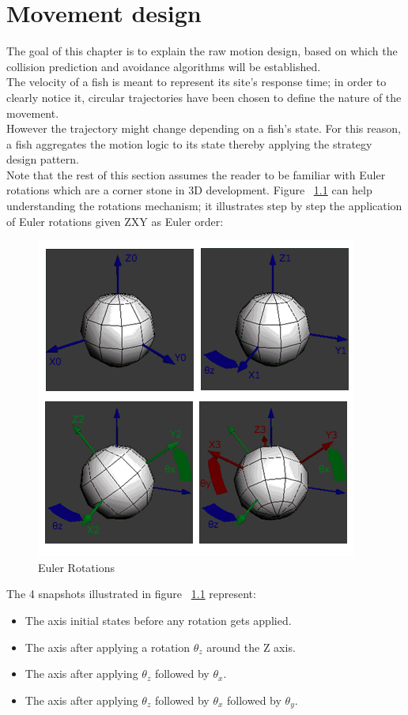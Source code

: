\chapter{Movement design}
The goal of this chapter is to explain the raw motion design, based on which the collision prediction and avoidance algorithms will be established.\\

The velocity of a fish is meant to represent its site's response time; in order to clearly notice it, circular trajectories have been chosen to define the nature of the movement.\\

However the trajectory might change depending on a fish's state. For this reason, a fish aggregates the motion logic to its state thereby applying the strategy design pattern.\\

Note that the rest of this section assumes the reader to be familiar with Euler rotations which are a corner stone in 3D development. Figure ~\ref{fig:euler-rotations} can help understanding the rotations mechanism; it illustrates step by step the application of Euler rotations given ZXY as Euler order: 

\begin{figure}[H]
   \centering
   \includegraphics[scale=0.65]{figures/euler.png}
   \caption{Euler Rotations}
   \label{fig:euler-rotations}
\end{figure}

The 4 snapshots illustrated in figure ~\ref{fig:euler-rotations} represent:
\begin{itemize}
\item The axis initial states before any rotation gets applied.
\item The axis after applying a rotation $\theta _{z} $ around the Z axis.
\item The axis after applying $\theta _{z}$ followed by $\theta _{x}$.
\item The axis after applying $\theta _{z}$ followed by $\theta _{x}$ followed by $\theta _{y}$.
\end{itemize}

